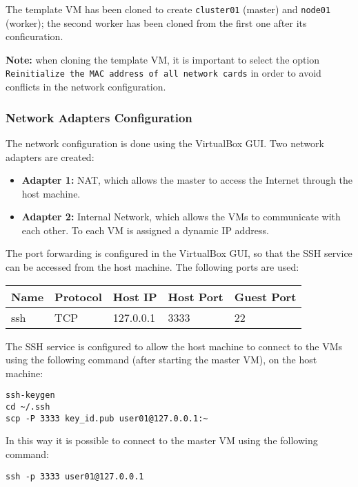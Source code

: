 The template VM has been cloned to create \texttt{cluster01} (master) and \texttt{node01} (worker); the second worker has been cloned from the first one after its conficuration. 

\textbf{Note:} when cloning the template VM, it is important to select the option \texttt{Reinitialize the MAC address of all network cards} in order to avoid conflicts in the network configuration.

\subsubsection{Network Adapters Configuration}

The network configuration is done using the VirtualBox GUI. Two network adapters are created:

\begin{itemize}
    \item \textbf{Adapter 1:} NAT, which allows the master to access the Internet through the host machine.
    \item \textbf{Adapter 2:} Internal Network, which allows the VMs to communicate with each other. To each VM is assigned a dynamic IP address.
\end{itemize}

The port forwarding is configured in the VirtualBox GUI, so that the SSH service can be accessed from the host machine. The following ports are used:

\begin{longtable}{|l|l|l|l|l|}
\hline
Name & Protocol & Host IP & Host Port & Guest Port \\
\hline
ssh & TCP & 127.0.0.1 & 3333 & 22 \\
\hline
\end{longtable}

The SSH service is configured to allow the host machine to connect to the VMs using the following command (after starting the master VM), on the host machine:

\begin{verbatim}
ssh-keygen
cd ~/.ssh
scp -P 3333 key_id.pub user01@127.0.0.1:~
\end{verbatim}

In this way it is possible to connect to the master VM using the following command:

\begin{verbatim}
ssh -p 3333 user01@127.0.0.1
\end{verbatim}

